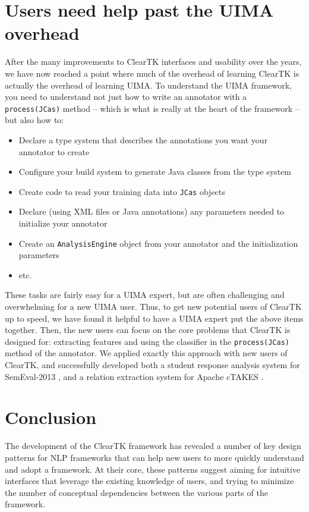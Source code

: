 \documentclass[10pt, a4paper]{article}
\newcommand{\code}[1]{\texttt{\small #1}}
\begin{document}
\section{Users need help past the UIMA overhead}
After the many improvements to ClearTK interfaces and usability over the years, we have now reached a point where much of the overhead of learning ClearTK is actually the overhead of learning UIMA.
To understand the UIMA framework, you need to understand not just how to write an annotator with a \code{process(JCas)} method -- which is what is really at the heart of the framework -- but also how to:
\begin{itemize}
\item Declare a type system that describes the annotations you want your annotator to create
\item Configure your build system to generate Java classes from the type system
\item Create code to read your training data into \code{JCas} objects
\item Declare (using XML files or Java annotations) any parameters needed to initialize your annotator
\item Create an \code{AnalysisEngine} object from your annotator and the initialization parameters
\item etc.
\end{itemize}
These tasks are fairly easy for a UIMA expert, but are often challenging and overwhelming for a new UIMA user.
Thus, to get new potential users of ClearTK up to speed, we have found it helpful to have a UIMA expert put the above items together.
Then, the new users can focus on the core problems that ClearTK is designed for: extracting features and using the classifier in the \code{process(JCas)} method of the annotator.
We applied exactly this approach with new users of ClearTK, and successfully developed both a student response analysis system for SemEval-2013 \cite{okoye-bethard-sumner:2013:SemEval-2013}, and a relation extraction system for Apache cTAKES \cite{dligach2013discovering}.

\section{Conclusion}
The development of the ClearTK framework has revealed a number of key design patterns for NLP frameworks that can help new users to more quickly understand and adopt a framework.
At their core, these patterns suggest aiming for intuitive interfaces that leverage the existing knowledge of users, and trying to minimize the number of conceptual dependencies between the various parts of the framework.
\end{document}
